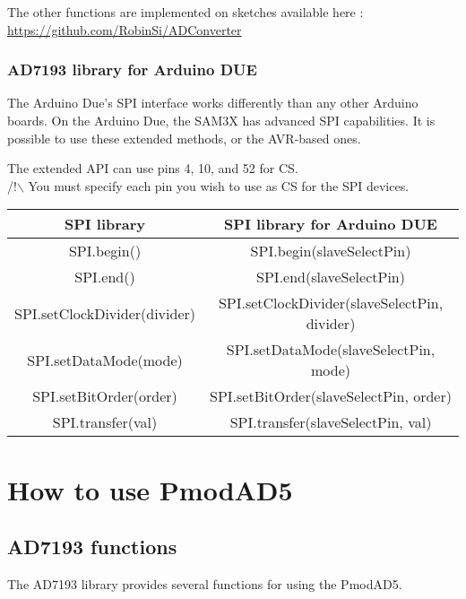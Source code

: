 \documentclass[10pt,a4paper]{report}
\begin{document}
The other functions are implemented on sketches available here : \\

\url{https://github.com/RobinSi/ADConverter}

\subsection{AD7193 library for Arduino DUE}

The Arduino Due's SPI interface works differently than any other Arduino boards.
On the Arduino Due, the SAM3X has advanced SPI capabilities. It is possible to use these extended methods, or the AVR-based ones.

The extended API can use pins 4, 10, and 52 for CS. \\

/!$\backslash$ You must specify each pin you wish to use as CS for the SPI devices.  

\begin{tabular}{|c|c|}
  \hline
  \textbf{SPI library} & \textbf{SPI library for Arduino DUE}   \\
  \hline
  SPI.begin()  & SPI.begin(slaveSelectPin)  \\
  \hline
  SPI.end()  & SPI.end(slaveSelectPin) \\
  \hline
  SPI.setClockDivider(divider) & SPI.setClockDivider(slaveSelectPin, divider) \\
  \hline
  SPI.setDataMode(mode) & SPI.setDataMode(slaveSelectPin, mode) \\
  \hline
  SPI.setBitOrder(order) & SPI.setBitOrder(slaveSelectPin, order)\\
  \hline
  SPI.transfer(val) & SPI.transfer(slaveSelectPin, val)\\
  \hline
\end{tabular}

\chapter{How to use PmodAD5}
\section{AD7193 functions}
The AD7193 library provides several functions for using the PmodAD5.
\end{document}
